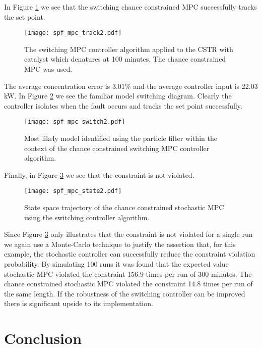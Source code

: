 In Figure \ref{fig_spf_mpc_track2} we see that the switching chance constrained MPC successfully tracks the set point.
\begin{figure}[H] 
\centering
\texttt{[image: spf\_mpc\_track2.pdf]}
\caption{The switching MPC controller algorithm applied to the CSTR with catalyst which denatures at 100 minutes. The chance constrained MPC was used.}
\label{fig_spf_mpc_track2}
\end{figure}
The average concentration error is 3.01\% and the average controller input is 22.03 kW. In Figure \ref{fig_spf_mpc_switch2} we see the familiar model switching diagram. Clearly the controller isolates when the fault occurs and tracks the set point successfully. 
\begin{figure}[H] 
\centering
\texttt{[image: spf\_mpc\_switch2.pdf]}
\caption{Most likely model identified using the particle filter within the context of the chance constrained switching MPC controller algorithm.}
\label{fig_spf_mpc_switch2}
\end{figure}
Finally, in Figure \ref{fig_spf_mpc_state2} we see that the constraint is not violated.
\begin{figure}[H] 
\centering
\texttt{[image: spf\_mpc\_state2.pdf]}
\caption{State space trajectory of the chance constrained stochastic MPC using the switching controller algorithm.}
\label{fig_spf_mpc_state2}
\end{figure}
Since Figure \ref{fig_spf_mpc_state2} only illustrates that the constraint is not violated for a single run we again use a Monte-Carlo technique to justify the assertion that, for this example, the stochastic controller can successfully reduce the constraint violation probability. By simulating 100 runs it was found that the expected value stochastic MPC violated the constraint 156.9 times per run of 300 minutes. The chance constrained stochastic MPC violated the constraint 14.8 times per run of the same length. If the robustness of the switching controller can be improved there is significant upside to its implementation.

\section{Conclusion}

